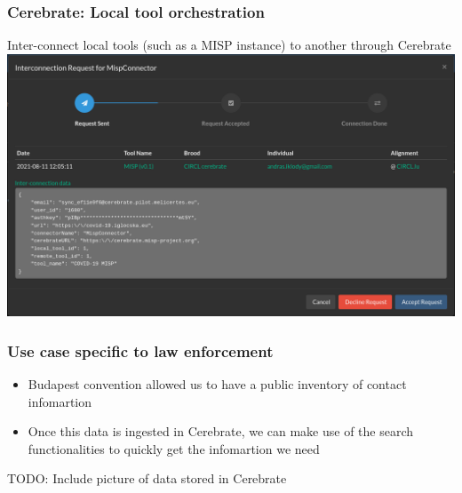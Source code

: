 \begin{frame}
    \frametitle{Cerebrate: Local tool orchestration}
    Inter-connect local tools (such as a MISP instance) to another through Cerebrate
    \includegraphics[width=1.0\linewidth]{pictures/cerebrate-inbox.png}
\end{frame}

\begin{frame}
    \frametitle{Use case specific to law enforcement}
    \begin{itemize}
        \item Budapest convention allowed us to have a public inventory of contact infomartion
        \item Once this data is ingested in Cerebrate, we can make use of the search functionalities to quickly get the infomartion we need
    \end{itemize}
    TODO: Include picture of data stored in Cerebrate
\end{frame}
